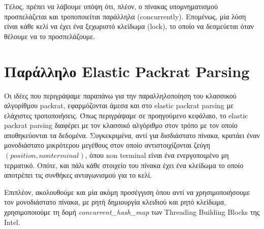 Τέλος, πρέπει να λάβουμε υπόψη ότι, πλέον, ο πίνακας υπομνηματισμού προσπελάζεται και τροποποιείται παράλληλα (concurrently).
Επομένως, μία λύση είναι κάθε κελί να έχει ένα ξεχωριστό κλείδωμα (lock), το οποίο να δεσμεύεται όταν θέλουμε να το προσπελάζουμε. %

\section{Παράλληλο Elastic Packrat Parsing}

Οι ιδέες που περιγράψαμε παραπάνω για την παραλληλοποίηση του κλασσικού αλγορίθμου packrat, εφαρμόζονται άμεσα και στο elastic packrat parsing με ελάχιστες τροποποιήσεις.
Όπως περιγράψαμε σε προηγούμενο κεφάλαιο, το elastic packrat parsing διαφέρει με τον κλασσικό αλγόριθμο στον τρόπο με τον οποίο αποθηκεύονται τα δεδομένα. 
Συγκεκριμένα, αντί για δισδιάστατο πίνακα, κρατάει έναν μονοδιάστατο μικρότερου μεγέθους στον οποίο αντιστοιχίζονται ζεύγη $(position, non terminal)$, όπου non terminal είναι ένα ενεργοποιμένο μη τερματικό.
Οπότε, και πάλι κάθε στοιχείο του πίνακα έχει ένα κλείδωμα το οποίο αποτρέπει τις συνθήκες ανταγωνισμού για το κελί.

Επιπλέον, ακολουθούμε και μία ακόμη προσέγγιση όπου αντί να χρησιμοποιήσουμε τον μονοδιάστατο πίνακα, με ρητή δημιουργία κλειδιού και ρητό κλείδωμα, χρησιμοποιούμε τη δομή \textit{concurrent\_hash\_map} των Threading Building Blocks της Intel.

